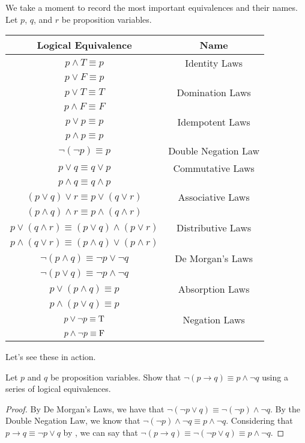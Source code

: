 \documentclass[../notes.tex]{subfiles}
\begin{document}
We take a moment to record the most important equivalences and their names. Let $p$, $q$, and $r$ be proposition variables.
\begin{center}
    \begin{tabular}{ c|c }
    Logical Equivalence & Name \\
    \hline
    $p \land T \equiv p$ & Identity Laws \\
    $p \lor F \equiv p$ & \\
    \hline
    $p \lor T \equiv T $ & Domination Laws \\
    $p \land F \equiv F$ & \\
    \hline
    $p \lor p \equiv p $ & Idempotent Laws \\
    $p \land p \equiv p$ & \\
    \hline
    $\neg (\neg p) \equiv p$ & Double Negation Law \\
    \hline
    $p \lor q \equiv q \lor p $ & Commutative Laws \\
    $p \land q \equiv q \land p $ & \\
    \hline
    $(p \lor q) \lor r \equiv p \lor (q \lor r)$ & Associative Laws \\
    $(p \land q) \land r \equiv p \land (q \land r)$ & \\
    \hline
    $ p \lor (q \land r) \equiv (p \lor q) \land (p \lor r)$ & Distributive Laws \\
    $ p \land (q \lor r) \equiv (p \land q) \lor (p \land r)$ & \\
    \hline
    $ \neg (p \land q) \equiv \neg p \lor \neg q$ & De Morgan's Laws \\
    $ \neg (p \lor q) \equiv \neg p \land \neg q$ & \\
    \hline
    $ p \lor (p \land q) \equiv p$ & Absorption Laws \\
    $ p \land (p \lor q) \equiv p$ & \\
    \hline
    $ p \lor \neg p \equiv\text T$ & Negation Laws \\
    $ p \land \neg p \equiv\text F$ &
    \end{tabular}
\end{center}
Let's see these in action.
\begin{example} \label{exe:better-arrow}
    Let $p$ and $q$ be proposition variables. Show that $\neg(p \rightarrow q)  \equiv p \land \neg q$ using a series of logical equivalences. 
\end{example}
\begin{proof}
    By De Morgan's Laws, we have that $\neg (\neg p \lor q) \equiv \neg (\neg p) \land \neg q$. By the Double Negation Law, we know that $\neg (\neg p) \land \neg q \equiv  p \land \neg q.$ Considering that $p \rightarrow q \equiv \neg p \lor q$ by , we can say that  $\neg(p \rightarrow q) \equiv \neg(\neg p \lor q) \equiv p \land \neg q.$
\end{proof}
\end{document}
